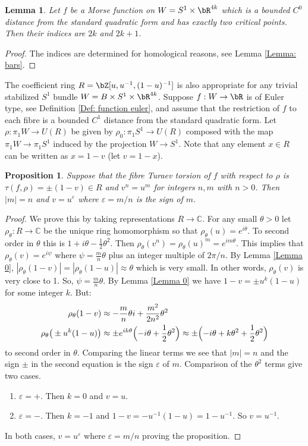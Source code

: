 \documentclass[JEP,XML,SOM,Unicode,NoFloatCountersInSection]{cedram}
\theoremstyle{plain}
\newtheorem{lemma}[theorem]{Lemma}
\newtheorem{proposition}[theorem]{Proposition}
\theoremstyle{definition}
\let\ve\varepsilon
\newcommand{\bC}{\mathbb{C}}\newcommand{\bD}{\mathbb{D}}
\begin{document}
\begin{lemma}\label{Lemma 0.0}
Let $f$ be a Morse function on $W=S^1\times \bR^{4k}$ which is a bounded $C^0$ distance from the standard quadratic form and has exactly two critical points. Then their indices are $2k$ and $2k+1$.
\end{lemma}

\begin{proof}
The indices are determined for homological reasons, see Lemma \ref{Lemma: bars}.
\end{proof}

The coefficient ring $R=\bZ[u,u^{-1},(1-u)^{-1}]$ is also appropriate for any trivial stabilized $S^1$ bundle $W=B\times S^1\times \bR^{4k}$. Suppose $f:W\to \bR$ is of Euler type, see Definition \ref{Def: function euler}, and assume that the restriction of $f$ to each fibre is a bounded $C^1$ distance from the standard quadratic form. Let $\rho:\pi_1W\to U(R)$ be given by $\rho_0:\pi_1S^1\to U(R)$ composed with the map $\pi_1W\to \pi_1S^1$ induced by the projection $W\to S^1$. Note that any element $x\in R$ can be written as $x=1-v$ (let $v=1-x$).

\begin{proposition}\label{prop: un=vm lemma}
Suppose that the fibre Turaev torsion of $f$ with respect to $\rho$ is $\tau(f,\rho)=\pm(1-v)\in R$ and $v^n=u^m$ for integers $n,m$ with $n>0$. Then $|m|=n$ and $v=u^\varepsilon$ where $\varepsilon=m/n$ is the sign of $m$.
\end{proposition}

\begin{proof}
We prove this by taking representations $R\to \bC$. For any small $\theta>0$ let \hbox{$\rho_\theta:R\to\bC$} be the unique ring homomorphism so that $\rho_\theta(u)=e^{i\theta}$. To second order in $\theta$ this is $1+i\theta-\frac12\theta^2$. Then $\rho_\theta(v^n)=\rho_\theta(u)^m=e^{im\theta}$. This implies that $\rho_\theta(v)=e^{i\psi}$ where $\psi=\frac mn\theta$ plus an integer multiple of $2\pi/n$. By Lemma \ref{Lemma 0}, $|\rho_\theta(1-v)|=|\rho_\theta(1-u)|\approx \theta$ which is very small. In other words, $\rho_\theta(v)$ is very close to 1. So, $\psi=\frac mn\theta$. By Lemma \ref{Lemma 0} we have $1-v= \pm u^k(1-u)$ for some integer $k$. But:
\begin{align*}
\rho_\theta(1-v)&\approx -\frac mn\theta i+\frac{m^2}{2n^2}\theta^2\\
\rho_\theta\big(\pm u^k (1-u)\big)&\approx \pm e^{ik\theta}\Bigl(
-i\theta +\frac12 \theta^2
\Bigr)\approx \pm \Bigl(
-i\theta +k\theta^2+\frac12\theta^2
\Bigr)
\end{align*}
to second order in $\theta$. Comparing the linear terms we see that $|m|= n$ and the sign $\pm$ in the second equation is the sign $\ve$ of $m$. Comparison of the $\theta^2$ terms give two cases.
\begin{enumerate}
\item $\ve=+$. Then $k=0$ and $v=u$.
\item $\ve=-$. Then $k=-1$ and $1-v=-u^{-1}(1-u)=1-u^{-1}$. So $v=u^{-1}$.
\end{enumerate}
In both cases, $v=u^\ve$ where $\ve=m/n$ proving the proposition.
\end{proof}
\end{document}
